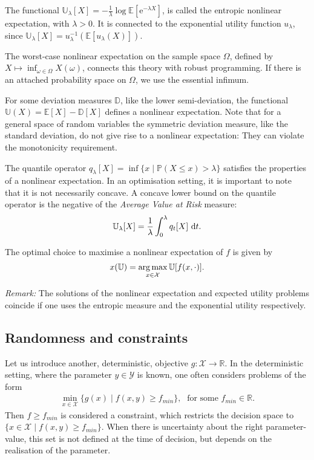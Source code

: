 \documentclass[main.tex]{subfiles}
\begin{document}
\begin{example}
  The functional $\mathbb U_\lambda[X]=-\frac{1}{\lambda}\log\mathbb
  E[\mathrm{e}^{-\lambda X}]$, is called the entropic nonlinear expectation,
  with $\lambda>0$.
  It is connected to the exponential utility function $u_\lambda$, since
  $\mathbb U_\lambda[X]= u_\lambda^{-1}(\mathbb E[u_\lambda(X)])$.

  The worst-case nonlinear expectation on the sample space $\Omega$,
  defined by
  $X\mapsto  \inf_{\omega\in\Omega}X(\omega)$, connects this theory with robust
  programming. If there is an attached probability space on $\Omega$,
  we use the essential infimum.

  For some deviation measures $\mathbb D$, like the lower
  semi-deviation, the functional $\mathbb U(X)=\mathbb E[X]-\mathbb
  D[X]$ defines a nonlinear expectation. Note that for a general space
  of random variables the symmetric deviation measure, like the
  standard deviation, do not give rise to a nonlinear
  expectation: They can violate the monotonicity requirement.

  The quantile operator
  $q_\lambda[X] = \inf\{x\mid\mathbb P(X\leq x)>
  \lambda\}$ satisfies the properties of a nonlinear expectation.
  In an optimisation setting, it is important to note that it is not
  necessarily concave.
  A concave lower bound on the quantile operator is
  the negative of the \emph{Average Value at Risk} measure:
  \begin{align}
    \mathbb U_\lambda[X]=\frac{1}{\lambda}\int_0^\lambda q_t[X]\,\,\mathrm{d}t.
  \end{align}
\end{example}

\begin{problem}
  The optimal choice to maximise a nonlinear expectation
  of $f$ is given by
  \begin{align}
    x(\mathbb U)=\operatorname*{arg\,max}_{x\in\mathcal{X}} \mathbb U[f(x,\cdot)].
  \end{align}
\end{problem}

\emph{Remark:} The solutions of the nonlinear expectation and expected
utility problems coincide if one uses the entropic measure and the exponential
utility respectively.

\subsection{Randomness and constraints}
Let us introduce another, deterministic, objective $g:\mathcal
X\to\mathbb R$. In the deterministic setting, where
the parameter $y\in\mathcal{Y}$ is known, one often considers problems
of the form
\begin{align}
  \min_{x\in\mathcal{X}}\{g(x)\mid f(x,y)\geq f_{min} \},\;
  \text{ for some } f_{min}\in\mathbb R.
\end{align}
Then $f\geq f_{min}$ is considered a constraint, which restricts the
decision space to $\{x\in\mathcal{X}\mid f(x,y)\geq f_{min}\}$.
When there is uncertainty about the right parameter-value, this set is
not defined at the time of decision, but depends on the realisation of
the parameter.
\end{document}
